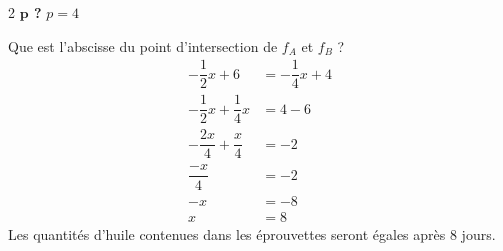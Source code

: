 \documentclass[a4paper, 12pt, parskip=half-]{scrartcl}
\begin{document}
\begin{solution}
\begin{enumerate}
\begin{multicols}{2}
                  \textbf{$\bm{p}$ ?}
                  \medbreak
                  $p=4$
              \end{multicols}
              Que est l'abscisse du point d'intersection de $f_A$ et $f_B$ ?
              \begin{align*}
                  -\dfrac{1}{2}x + 6             & = -\dfrac{1}{4}x + 4 \\
                  -\dfrac{1}{2}x + \dfrac{1}{4}x & = 4 - 6              \\
                  -\dfrac{2x}{4} + \dfrac{x}{4}  & = -2                 \\
                  \dfrac{-x}{4}                  & = -2                 \\
                  -x                             & = -8                 \\
                  x                              & = 8
              \end{align*}
              Les quantités d'huile contenues dans les éprouvettes seront égales après 8 jours.
    \end{enumerate}
\end{solution}
%         
\end{document}
